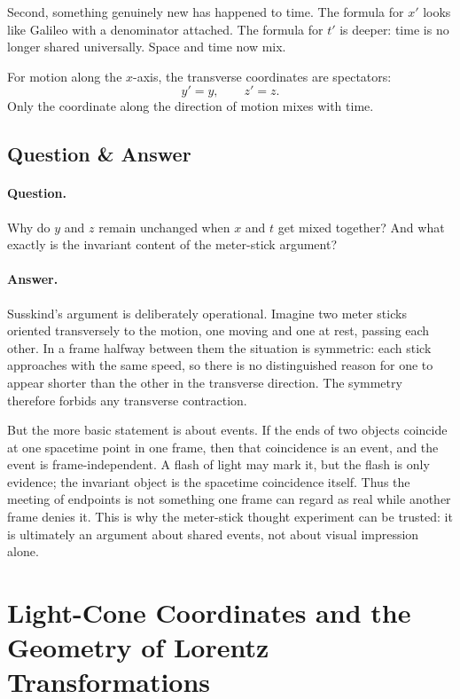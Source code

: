 Second, something genuinely new has happened to time. The formula for \(x'\) looks like Galileo with a denominator attached. The formula for \(t'\) is deeper: time is no longer shared universally. Space and time now mix.

For motion along the \(x\)-axis, the transverse coordinates are spectators:
\begin{equation}
y'=y, \qquad z'=z.
\end{equation}
Only the coordinate along the direction of motion mixes with time.

\subsection{Question \& Answer}

\paragraph{Question.} Why do \(y\) and \(z\) remain unchanged when \(x\) and \(t\) get mixed together? And what exactly is the invariant content of the meter-stick argument?

\paragraph{Answer.} Susskind's argument is deliberately operational. Imagine two meter sticks oriented transversely to the motion, one moving and one at rest, passing each other. In a frame halfway between them the situation is symmetric: each stick approaches with the same speed, so there is no distinguished reason for one to appear shorter than the other in the transverse direction. The symmetry therefore forbids any transverse contraction.

But the more basic statement is about events. If the ends of two objects coincide at one spacetime point in one frame, then that coincidence is an event, and the event is frame-independent. A flash of light may mark it, but the flash is only evidence; the invariant object is the spacetime coincidence itself. Thus the meeting of endpoints is not something one frame can regard as real while another frame denies it. This is why the meter-stick thought experiment can be trusted: it is ultimately an argument about shared events, not about visual impression alone.

\section{Light-Cone Coordinates and the Geometry of Lorentz Transformations}

